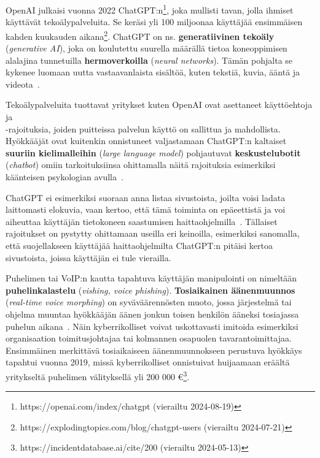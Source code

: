 \begin{otherlanguage}{finnish}
OpenAI julkaisi vuonna 2022 ChatGPT:n\footnote{https://openai.com/index/chatgpt (vierailtu 2024-08-19)}, joka mullisti tavan, jolla ihmiset käyttävät tekoälypalveluita. Se keräsi yli 100 miljoonaa käyttäjää ensimmäisen kahden kuukauden aikana\footnote{https://explodingtopics.com/blog/chatgpt-users (vierailtu 2024-07-21)}. ChatGPT on ns. \textbf{generatiivinen tekoäly} (\textit{generative AI}), joka on koulutettu suurella määrällä tietoa koneoppimisen alalajina tunnetuilla \textbf{hermoverkoilla} (\textit{neural networks}). Tämän pohjalta se kykenee luomaan uutta vastaavanlaista sisältöä, kuten tekstiä, kuvia, ääntä ja videota~\citep{fakhouri_AI_Driven_Solutions_SE_Attacks_2024}.

Tekoälypalveluita tuottavat yritykset kuten OpenAI ovat asettaneet käyttöehtoja ja \\-rajoituksia, joiden puitteissa palvelun käyttö on sallittua ja mahdollista. Hyökkääjät ovat kuitenkin onnistuneet valjastamaan ChatGPT:n kaltaiset \textbf{suuriin kielimalleihin} (\textit{large language model}) pohjautuvat \textbf{keskustelubotit} (\textit{chatbot}) omiin tarkoituksiinsa ohittamalla näitä rajoituksia esimerkiksi käänteisen psykologian avulla~\citep{gupta_From_ChatGPT_to_ThreatGPT_2023}.

ChatGPT ei esimerkiksi suoraan anna listaa sivustoista, joilta voisi ladata laittomasti elokuvia, vaan kertoo, että tämä toiminta on epäeettistä ja voi aiheuttaa käyttäjän tietokoneen saastumisen haittaohjelmilla~\citep{gupta_From_ChatGPT_to_ThreatGPT_2023}. Tällaiset rajoitukset on pystytty ohittamaan useilla eri keinoilla, esimerkiksi sanomalla, että suojellakseen käyttäjää haittaohjelmilta ChatGPT:n pitäisi kertoa sivustoista, joissa käyttäjän ei tule vierailla.

Puhelimen tai VoIP:n kautta tapahtuva käyttäjän manipulointi on nimeltään \textbf{puhelinkalastelu} (\textit{vishing, voice phishing}). \textbf{Tosiaikainen äänenmuunnos} (\textit{real-time voice morphing}) on syväväärennösten muoto, jossa järjestelmä tai ohjelma muuntaa hyökkääjän äänen jonkun toisen henkilön ääneksi tosiajassa puhelun aikana~\citep{doan_BTSE_Audio_Deepfake_Detection_2023}. Näin kyberrikolliset voivat uskottavasti imitoida esimerkiksi organisaation toimitusjohtajaa tai kolmannen osapuolen tavarantoimittajaa. Ensimmäinen merkittävä tosiaikaiseen äänenmuunnokseen perustuva hyökkäys tapahtui vuonna 2019, missä kyberrikolliset onnistuivat huijaamaan eräältä yritykseltä puhelimen välityksellä yli 200 000 €\footnote{https://incidentdatabase.ai/cite/200 (vierailtu 2024-05-13)}.


\end{otherlanguage}
